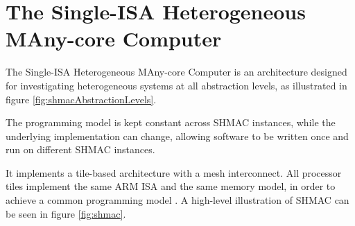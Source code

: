 



\section{The Single-ISA Heterogeneous MAny-core Computer}
\label{sec:shmac}

The Single-ISA Heterogeneous MAny-core Computer is an architecture designed for investigating heterogeneous
systems at all abstraction levels, as illustrated in figure \ref{fig:shmacAbstractionLevels}.

The programming model is kept constant across SHMAC instances, while the underlying implementation can change,
allowing software to be written once and run on different SHMAC instances.

It implements a tile-based architecture with a mesh interconnect. All processor tiles implement the same
ARM ISA and the same memory model, in order to achieve a common programming model \cite{shmac-plan}.
A high-level illustration of SHMAC can be seen in figure \ref{fig:shmac}.

